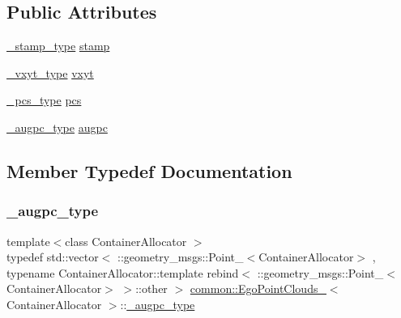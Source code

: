 \subsection*{Public Attributes}
\begin{DoxyCompactItemize}
\item 
\hyperlink{structcommon_1_1EgoPointClouds___a45a194b26ca8e4132a7d5e02e659d68f}{\+\_\+stamp\+\_\+type} \hyperlink{structcommon_1_1EgoPointClouds___a14e74473df2663017f1de20086293873}{stamp}
\item 
\hyperlink{structcommon_1_1EgoPointClouds___a92f4c266292be35a268030b544d34d6d}{\+\_\+vxyt\+\_\+type} \hyperlink{structcommon_1_1EgoPointClouds___a7e0628045c2815ba8ab5be4305ad7851}{vxyt}
\item 
\hyperlink{structcommon_1_1EgoPointClouds___ae9a969cfa2bb2b88e7c3dad0cfe9373d}{\+\_\+pcs\+\_\+type} \hyperlink{structcommon_1_1EgoPointClouds___aefd8e4c72a8c165032a5a0d85e6f95b1}{pcs}
\item 
\hyperlink{structcommon_1_1EgoPointClouds___ab7459c5c41c654d199a21f760dd00379}{\+\_\+augpc\+\_\+type} \hyperlink{structcommon_1_1EgoPointClouds___a6ef7f04027158021ac93209e1a9b696a}{augpc}
\end{DoxyCompactItemize}


\subsection{Member Typedef Documentation}
\mbox{\label{structcommon_1_1EgoPointClouds___ab7459c5c41c654d199a21f760dd00379}} 
\subsubsection{\texorpdfstring{\+\_\+augpc\+\_\+type}{\_augpc\_type}}
{\footnotesize\ttfamily template$<$class Container\+Allocator $>$ \\
typedef std\+::vector$<$ \+::geometry\+\_\+msgs\+::\+Point\+\_\+$<$Container\+Allocator$>$ , typename Container\+Allocator\+::template rebind$<$ \+::geometry\+\_\+msgs\+::\+Point\+\_\+$<$Container\+Allocator$>$ $>$\+::other $>$ \hyperlink{structcommon_1_1EgoPointClouds__}{common\+::\+Ego\+Point\+Clouds\+\_\+}$<$ Container\+Allocator $>$\+::\hyperlink{structcommon_1_1EgoPointClouds___ab7459c5c41c654d199a21f760dd00379}{\+\_\+augpc\+\_\+type}}

